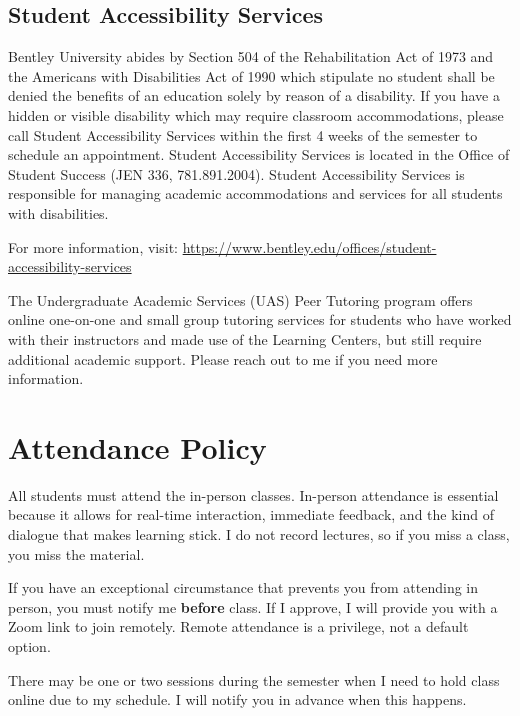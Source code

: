 \documentclass[11pt,letterpaper]{article}
\begin{document}
\subsection*{Student Accessibility Services}
Bentley University abides by Section 504 of the Rehabilitation Act of 1973 and the Americans with Disabilities Act of 1990 which stipulate no student shall be denied the benefits of an education solely by reason of a disability. If you have a hidden or visible disability which may require classroom accommodations, please call Student Accessibility Services within the first 4 weeks of the semester to schedule an appointment. Student Accessibility Services is located in the Office of Student Success (JEN 336, 781.891.2004). Student Accessibility Services is responsible for managing academic accommodations and services for all students with disabilities.

For more information, visit: \url{https://www.bentley.edu/offices/student-accessibility-services}

The Undergraduate Academic Services (UAS) Peer Tutoring program offers online one-on-one and small group tutoring services for students who have worked with their instructors and made use of the Learning Centers, but still require additional academic support. Please reach out to me if you need more information.

\section*{Attendance Policy}

All students must attend the in-person classes. In-person attendance is essential because it allows for real-time interaction, immediate feedback, and the kind of dialogue that makes learning stick. I do not record lectures, so if you miss a class, you miss the material.

If you have an exceptional circumstance that prevents you from attending in person, you must notify me \textbf{before} class. If I approve, I will provide you with a Zoom link to join remotely. Remote attendance is a privilege, not a default option.

There may be one or two sessions during the semester when I need to hold class online due to my schedule. I will notify you in advance when this happens.

\end{document}
